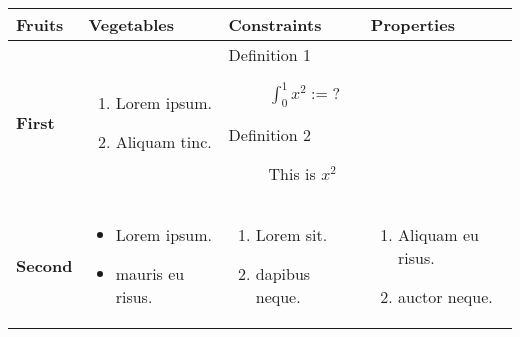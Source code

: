 \documentclass[
  12pt,
  british,
  a4paper,
  twoside,
  titlepage,
  openright,
  numbers=noenddot,
  chapterprefix=true,
  headings=optiontohead,
  svgnames,
  dvipsnames]{scrreprt}
\begin{document}
\begin{longtable}[]{@{}llll@{}}
\toprule
Fruits & Vegetables & Constraints & Properties\tabularnewline
\midrule
\endhead
\begin{minipage}[t]{0.22\columnwidth}\raggedright
\textbf{First}\strut
\end{minipage} & \begin{minipage}[t]{0.22\columnwidth}\raggedright
\begin{enumerate}
\item
  Lorem ipsum.
\item
  Aliquam tinc.
\end{enumerate}\strut
\end{minipage} & \begin{minipage}[t]{0.22\columnwidth}\raggedright
\begin{description}
\item[Definition 1]
\(\int_0^1{x^2} := ?\)
\item[Definition 2]
This is \(x^2\)
\end{description}\strut
\end{minipage} & \begin{minipage}[t]{0.22\columnwidth}\raggedright
\strut
\end{minipage}\tabularnewline
\begin{minipage}[t]{0.22\columnwidth}\raggedright
\textbf{Second}\strut
\end{minipage} & \begin{minipage}[t]{0.22\columnwidth}\raggedright
\begin{itemize}
\item
  Lorem ipsum.
\item
  mauris eu risus.
\end{itemize}\strut
\end{minipage} & \begin{minipage}[t]{0.22\columnwidth}\raggedright
\begin{enumerate}
\item
  Lorem sit.
\item
  dapibus neque.
\end{enumerate}\strut
\end{minipage} & \begin{minipage}[t]{0.22\columnwidth}\raggedright
\begin{enumerate}
\item
  Aliquam eu risus.
\item
  auctor neque.
\end{enumerate}\strut
\end{minipage}\tabularnewline
\bottomrule
\end{longtable}
\end{document}
